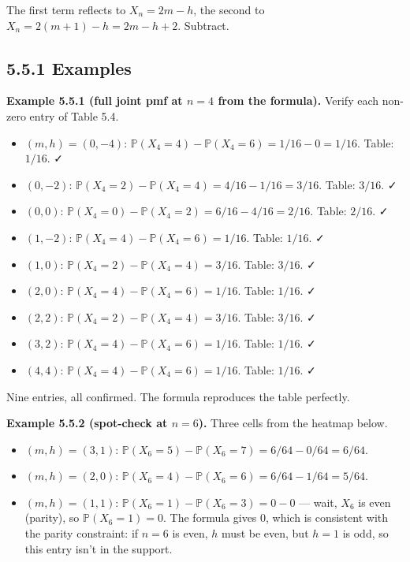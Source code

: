 \documentclass[
  10pt,
  twoside]{book}
\providecommand{\tightlist}{%
  \setlength{\itemsep}{0pt}\setlength{\parskip}{0pt}}
\begin{document}
The first term reflects to \(X_n = 2m - h\), the second to
\(X_n = 2(m+1) - h = 2m - h + 2\). Subtract.

\subsection{5.5.1 Examples}\label{examples-26}

\textbf{Example 5.5.1 (full joint pmf at \(n = 4\) from the formula).}
Verify each non-zero entry of Table 5.4.

\begin{itemize}
\tightlist
\item
  \((m, h) = (0, -4)\):
  \(\mathbb P(X_4 = 4) - \mathbb P(X_4 = 6) = 1/16 - 0 = 1/16\). Table:
  \(1/16\). ✓
\item
  \((0, -2)\):
  \(\mathbb P(X_4 = 2) - \mathbb P(X_4 = 4) = 4/16 - 1/16 = 3/16\).
  Table: \(3/16\). ✓
\item
  \((0, 0)\):
  \(\mathbb P(X_4 = 0) - \mathbb P(X_4 = 2) = 6/16 - 4/16 = 2/16\).
  Table: \(2/16\). ✓
\item
  \((1, -2)\): \(\mathbb P(X_4 = 4) - \mathbb P(X_4 = 6) = 1/16\).
  Table: \(1/16\). ✓
\item
  \((1, 0)\): \(\mathbb P(X_4 = 2) - \mathbb P(X_4 = 4) = 3/16\). Table:
  \(3/16\). ✓
\item
  \((2, 0)\): \(\mathbb P(X_4 = 4) - \mathbb P(X_4 = 6) = 1/16\). Table:
  \(1/16\). ✓
\item
  \((2, 2)\): \(\mathbb P(X_4 = 2) - \mathbb P(X_4 = 4) = 3/16\). Table:
  \(3/16\). ✓
\item
  \((3, 2)\): \(\mathbb P(X_4 = 4) - \mathbb P(X_4 = 6) = 1/16\). Table:
  \(1/16\). ✓
\item
  \((4, 4)\): \(\mathbb P(X_4 = 4) - \mathbb P(X_4 = 6) = 1/16\). Table:
  \(1/16\). ✓
\end{itemize}

Nine entries, all confirmed. The formula reproduces the table perfectly.

\textbf{Example 5.5.2 (spot-check at \(n = 6\)).} Three cells from the
heatmap below.

\begin{itemize}
\tightlist
\item
  \((m, h) = (3, 1)\):
  \(\mathbb P(X_6 = 5) - \mathbb P(X_6 = 7) = 6/64 - 0/64 = 6/64\).
\item
  \((m, h) = (2, 0)\):
  \(\mathbb P(X_6 = 4) - \mathbb P(X_6 = 6) = 6/64 - 1/64 = 5/64\).
\item
  \((m, h) = (1, 1)\):
  \(\mathbb P(X_6 = 1) - \mathbb P(X_6 = 3) = 0 - 0\) --- wait, \(X_6\)
  is even (parity), so \(\mathbb P(X_6 = 1) = 0\). The formula gives 0,
  which is consistent with the parity constraint: if \(n = 6\) is even,
  \(h\) must be even, but \(h = 1\) is odd, so this entry isn't in the
  support.
\end{itemize}
\end{document}
